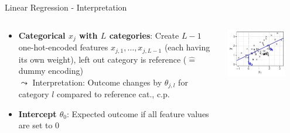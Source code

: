 \documentclass[11pt,compress,t,notes=noshow, aspectratio=169, xcolor=table]{beamer}
\begin{document}
\begin{frame}[c]{Linear Regression - Interpretation}
\begin{columns}[T, totalwidth = \linewidth]
\begin{column}{0.58\linewidth}
    \begin{itemize}
        \item<3-> %
        \textbf{Categorical $x_j$ with $L$ categories}: Create $L-1$ one-hot-encoded features $x_{j,1}, \hdots, x_{j,L-1}$ (each having its own weight), left out category is reference ($\hat =$ dummy encoding)
        \\
        $\leadsto$ Interpretation:
        Outcome changes by $\theta_{j,l}$ for category $l$ compared to reference cat.,  c.p.
        \item<4> \textbf{Intercept $\theta_0$}: Expected outcome if all feature values are set to 0 %
    \end{itemize}
\end{column}
\begin{column}{0.42\linewidth}
\begin{center}
        \includegraphics[width = 0.8\textwidth]{figure/reg_lm_plot_interpreted.pdf}\\
    \end{center}
\end{column}
\end{columns}
    
\end{frame}
\end{document}
